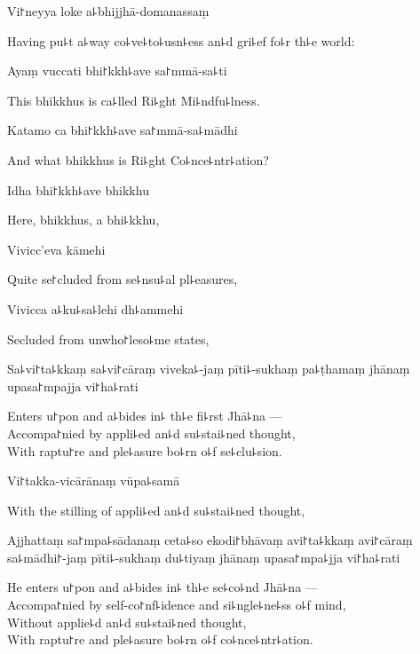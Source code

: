 Vi꜓neyya loke a꜕bhijjhā-domanassaṃ

\begin{english}
  Having pu꜕t a꜕way co꜕ve꜕to꜕usn꜕ess an꜕d gri꜕ef fo꜕r th꜕e world:
\end{english}

Ayaṃ vuccati bhi꜓kkh꜕ave sa꜓mmā-sa꜕ti

\begin{english}
  This bhikkhus is ca꜕lled Ri꜕ght Mi꜕ndfu꜕lness.
\end{english}

Katamo ca bhi꜓kkh꜕ave sa꜓mmā-sa꜕mādhi

\begin{english}
  And what bhikkhus is Ri꜕ght Co꜕nce꜕ntr꜕ation?
\end{english}

Idha bhi꜓kkh꜕ave bhikkhu

\begin{english}
  Here, bhikkhus, a bhi꜕kkhu,
\end{english}

Vivicc'eva kāmehi

\begin{english}
  Quite se꜓cluded from se꜕nsu꜕al pl꜕easures,
\end{english}

Vivicca a꜕ku꜕sa꜕lehi dh꜕ammehi

\begin{english}
  Secluded from unwho꜓leso꜕me states,
\end{english}

Sa꜕vi꜓ta꜕kkaṃ sa꜕vi꜓cāraṃ viveka꜕-jaṃ pīti꜕-sukhaṃ pa꜕ṭhamaṃ jhānaṃ upasa꜓mpajja vi꜓ha꜕rati

\begin{english}
  Enters u꜓pon and a꜕bides in꜕ th꜕e fi꜕rst Jhā꜕na ---\\
  Accompa꜓nied by appli꜕ed an꜕d su꜕stai꜕ned thought,\\
  With raptu꜓re and ple꜕asure bo꜕rn o꜕f se꜕clu꜕sion.
\end{english}

Vi꜓takka-vicārānaṃ vūpa꜕samā

\begin{english}
  With the stilling of appli꜕ed an꜕d su꜕stai꜕ned thought,
\end{english}

Ajjhattaṃ sa꜓mpa꜕sādanaṃ ceta꜕so ekodi꜓bhāvaṃ avi꜓ta꜕kkaṃ avi꜓cāraṃ sa꜕mādhi꜓-jaṃ pīti꜕-sukhaṃ du꜕tiyaṃ jhānaṃ upasa꜓mpa꜕jja vi꜓ha꜕rati

\begin{english}
  He enters u꜓pon and a꜕bides in꜕ th꜕e se꜕co꜕nd Jhā꜕na ---\\
  Accompa꜓nied by self-co꜓nf꜕idence and si꜕ngle꜕ne꜕ss o꜕f mind,\\
  Without applie꜕d an꜕d su꜕stai꜕ned thought,\\
  With raptu꜓re and ple꜕asure bo꜕rn o꜕f co꜕nce꜕ntr꜕ation.
\end{english}

